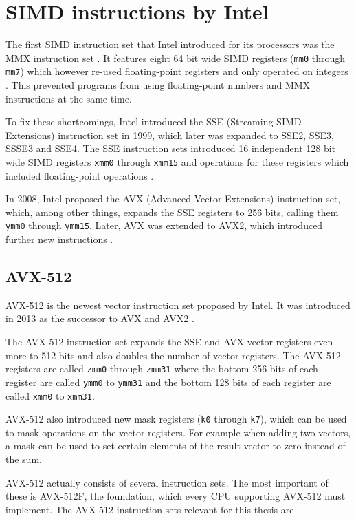 \documentclass[12pt, a4paper, openright, twoside]{tiarbeit}
\begin{document}
\section{SIMD instructions by Intel}

The first SIMD instruction set that Intel introduced for its processors
was the MMX instruction set \citep{washingtonpost_mmx}. It features eight 64 bit
wide SIMD registers (\texttt{mm0} through \texttt{mm7}) which however
re-used floating-point registers and only operated on integers
\citep{enwiki:mmx}. This prevented programs from using floating-point numbers
and MMX instructions at the same time.

To fix these shortcomings, Intel introduced the SSE (Streaming SIMD Extensions)
instruction set in 1999, which later was expanded
to SSE2, SSE3, SSSE3 and SSE4. The SSE instruction sets
introduced 16 independent 128 bit wide SIMD registers
\texttt{xmm0} through \texttt{xmm15} and operations for these registers
which included floating-point operations
\citep{enwiki:sse}.

In 2008, Intel proposed the AVX (Advanced Vector Extensions) instruction set,
which, among other things, expands the SSE registers to 256 bits, calling
them \texttt{ymm0} through \texttt{ymm15}.
Later, AVX was extended to AVX2,
which introduced further new instructions \citep{enwiki:avx}.

\subsection{AVX-512}

AVX-512 is the newest vector instruction set proposed by Intel.
It was introduced in 2013 as the successor to AVX and AVX2 \citep{intel_avx_512}.

The AVX-512 instruction set expands the SSE and AVX vector registers even more
to 512 bits and also doubles the number of vector registers. The AVX-512
registers are called \texttt{zmm0} through \texttt{zmm31} where the bottom
256 bits of each register
are called \texttt{ymm0} to \texttt{ymm31} and the bottom 128 bits of each
register are called \texttt{xmm0} to \texttt{xmm31}.

AVX-512 also introduced new mask registers (\texttt{k0} through \texttt{k7}),
which can be used to mask operations on the vector registers. For example
when adding two vectors, a mask can be used to set certain elements of the
result vector to zero instead of the sum.

AVX-512 actually consists of several instruction sets. The most
important of these is AVX-512F, the foundation, which every CPU supporting
AVX-512 must implement. The AVX-512 instruction sets relevant for this
thesis are
\end{document}
